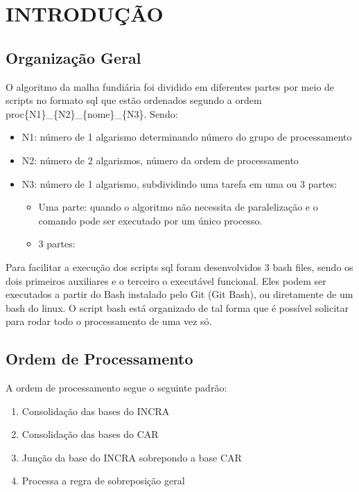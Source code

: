\chapter{INTRODUÇÃO}
\begin{multicols}{2}

\section{Organização Geral}
O algoritmo da malha fundiária foi dividido em diferentes partes por meio de scripts no formato sql que estão ordenados segundo a ordem proc\{N1\}\_\{N2\}\_\{nome\}\_\{N3\}. Sendo: 
\begin{itemize}
    \item N1: número de 1 algarismo determinando número do grupo de processamento
    \item N2: número de 2 algarismos, número da ordem de processamento
    \item N3: número de 1 algarismo, subdividindo uma tarefa em uma ou 3 partes: \begin{itemize}
        \item Uma parte: quando o algoritmo não necessita de paralelização e o comando pode ser executado por um único processo.
        \item 3 partes: 
    \end{itemize}
\end{itemize}
    
Para facilitar a execução dos scripts sql foram desenvolvidos 3 bash files, sendo os dois primeiros auxiliares e o terceiro o executável funcional. Eles podem ser executados a partir do Bash instalado pelo Git (Git Bash), ou diretamente de um bash do linux. O script bash está organizado de tal forma que é possível solicitar para rodar todo o processamento de uma vez só.

\section{Ordem de Processamento}
A ordem de processamento segue o seguinte padrão:
\begin{enumerate}
    \item Consolidação das bases do INCRA
    \item Consolidação das bases do CAR
    \item Junção da base do INCRA sobrepondo a base CAR
    \item Processa a regra de sobreposição geral
\end{enumerate}
\end{multicols}